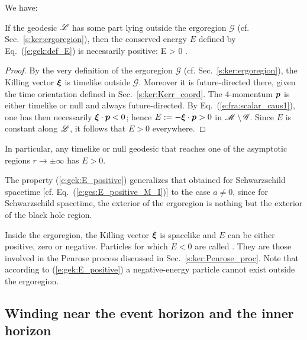 We have:
\begin{greybox}
If the geodesic $\mathscr{L}$ has some part lying outside the ergoregion $\mathscr{G}$ (cf. Sec.~\ref{s:ker:ergoregion}),
then the conserved energy $E$ defined by Eq.~(\ref{e:gek:def_E}) is necessarily positive:
\be \label{e:gek:E_positive}
    \Li \not\subset {}\quad \Longrightarrow \quad E > 0 .
\ee
\end{greybox}
\begin{proof}
By the very definition of the ergoregion $\mathscr{G}$ (cf. Sec.~\ref{s:ker:ergoregion}),
the Killing vector $\bm{\xi}$ is timelike outside $\mathscr{G}$. Moreover it is
future-directed there, given the time orientation defined in Sec.~\ref{s:ker:Kerr_coord}.
The 4-momentum $\bm{p}$ is either timelike or null and always future-directed.
By Eq.~(\ref{e:fra:scalar_caus1}), one has then necessarily $\bm{\xi}\cdot\bm{p} < 0$; hence
$E := - \bm{\xi}\cdot\bm{p} > 0$ in $\mathscr{M}\setminus \mathscr{G}$. Since $E$ is constant along $\mathscr{L}$, it
follows that $E > 0$ everywhere.
\end{proof}
In particular, any timelike or null geodesic that reaches one of the asymptotic regions
$r\to\pm\infty$ has $E>0$.
\begin{remark}
The property (\ref{e:gek:E_positive}) generalizes that obtained for Schwarzschild spacetime [cf. Eq.~(\ref{e:ges:E_positive_M_I})] to
the case $a\not=0$, since for Schwarzschild spacetime, the exterior of the ergoregion
is nothing but the exterior of the black hole region.
\end{remark}

Inside the ergoregion, the Killing vector $\bm{\xi}$ is spacelike and $E$ can be
either positive, zero or negative. Particles for which $E<0$ are called
. They are those involved in the Penrose process discussed in Sec.~\ref{s:ker:Penrose_proc}.
Note that according to (\ref{e:gek:E_positive}) a negative-energy particle cannot exist
outside the ergoregion.

\subsection{Winding near the event horizon and the inner horizon}

